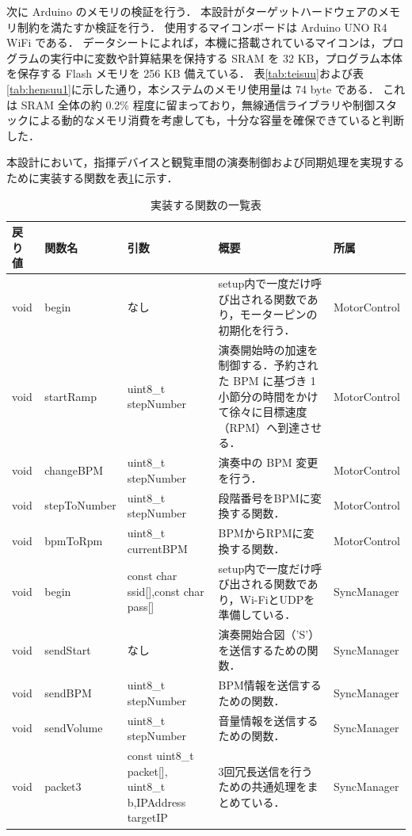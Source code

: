 \documentclass[lualatex,book,paper=a4paper,jafontsize=11.5pt,jafontscale=1.05]{jlreq}
\begin{document}
次に Arduino のメモリの検証を行う．
本設計がターゲットハードウェアのメモリ制約を満たすか検証を行う．
使用するマイコンボードは Arduino UNO R4 WiFi である．
データシートによれば，本機に搭載されているマイコンは，プログラムの実行中に変数や計算結果を保持する SRAM を 32 KB，プログラム本体を保存する Flash メモリを 256 KB 備えている\cite{ref:Arduino_memori}．
表\ref{tab:teisuu}および表\ref{tab:hensuu1}に示した通り，本システムのメモリ使用量は 74 byte である．
これは SRAM 全体の約 0.2\% 程度に留まっており，無線通信ライブラリや制御スタックによる動的なメモリ消費を考慮しても，十分な容量を確保できていると判断した．

本設計において，指揮デバイスと観覧車間の演奏制御および同期処理を実現するために実装する関数を表\ref{tab:function}に示す．

\begin{table}[H]
    \centering
    \caption{実装する関数の一覧表}
    \label{tab:function}
    {\small
    \begin{tabular}{llp{3cm}p{5cm}l} \hline
    \textbf{戻り値} & \textbf{関数名} & \textbf{引数} & \textbf{概要} & \textbf{所属} \\ \hline
    void & begin & なし & setup内で一度だけ呼び出される関数であり，モーターピンの初期化を行う． & MotorControl \\ \hline
    void & startRamp & uint8\_t stepNumber & 演奏開始時の加速を制御する．予約された BPM に基づき 1 小節分の時間をかけて徐々に目標速度（RPM）へ到達させる． & MotorControl \\ \hline
    void & changeBPM & uint8\_t stepNumber & 演奏中の BPM 変更を行う． & MotorControl \\ \hline
    void & stepToNumber & uint8\_t stepNumber & 段階番号をBPMに変換する関数． & MotorControl \\ \hline
    void & bpmToRpm & uint8\_t currentBPM & BPMからRPMに変換する関数． & MotorControl \\ \hline
    
    void & begin & const char ssid[],const char pass[] & setup内で一度だけ呼び出される関数であり，Wi-FiとUDPを準備している． & SyncManager \\ \hline
    void & sendStart & なし & 演奏開始合図（'S'）を送信するための関数． & SyncManager \\ \hline
    void & sendBPM & uint8\_t stepNumber & BPM情報を送信するための関数． & SyncManager \\ \hline
    void & sendVolume & uint8\_t stepNumber & 音量情報を送信するための関数． & SyncManager \\ \hline
    void & packet3 & const uint8\_t packet[], uint8\_t b,IPAddress targetIP & 3回冗長送信を行うための共通処理をまとめている． & SyncManager \\ \hline
    \end{tabular}
    }
\end{table}
\end{document}
